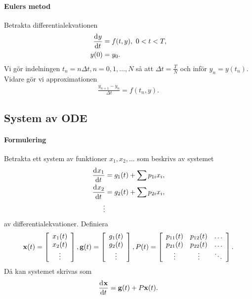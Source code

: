 \paragraph{Eulers metod}
Betrakta differentialekvationen
\begin{align*}
	\dv[]{y}{t} (t) &= f(t, y),\ 0 < t < T, \\
	y(0)             &= y_0.
\end{align*}
Vi gör indelningen $t_n = n\Delta t, n = 0, 1, \dots, N$ så att $\Delta t = \frac{T}{N}$ och inför $y_n = y(t_n)$. Vidare gör vi approximationen
\begin{align*}
	\frac{y_{n + 1} - y_{n}}{\Delta t} = f(t_n, y).
\end{align*}

\subsection{System av ODE}

\paragraph{Formulering}
Betrakta ett system av funktioner $x_{1}, x_{2}, \dots$ som beskrivs av systemet
\begin{align*}
	\dv[]{x_{1}}{t} (t) &= g_{1}(t) + \sum p_{1i}x_{i}, \\
	\dv[]{x_{2}}{t} (t) &= g_{2}(t) + \sum p_{2i}x_{i}, \\
	\vdots
\end{align*}
av differentialekvationer. Definiera
\begin{align*}
	\vb{x}(t) =\left[
	\begin{array}{c}
		x_{1}(t) \\
		x_{2}(t) \\
		\vdots
	\end{array}\right],
	\vb{g}(t) =\left[
	\begin{array}{c}
		g_{1}(t) \\
		g_{2}(t) \\
		\vdots
	\end{array}\right],
	P(t) =\left[
	\begin{array}{ccc}
		p_{11}(t) & p_{12}(t) & \dots \\
		p_{21}(t) & p_{22}(t) & \dots \\
		\vdots    & \vdots    & \ddots
	\end{array}\right].
\end{align*}
Då kan systemet skrivas som
\begin{align*}
	\dv[]{\vb{x}}{t} (t) = \vb{g}(t) + P\vb{x}(t).
\end{align*}

